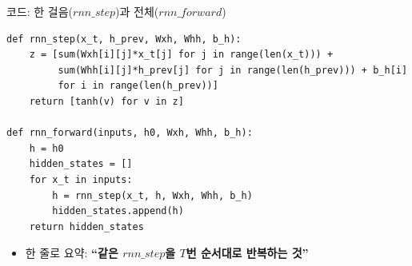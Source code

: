 \begin{frame}[fragile]{코드: 한 걸음($rnn\_step$)과 전체($rnn\_forward$)}
\begin{lstlisting}
def rnn_step(x_t, h_prev, Wxh, Whh, b_h):
    z = [sum(Wxh[i][j]*x_t[j] for j in range(len(x_t))) +
         sum(Whh[i][j]*h_prev[j] for j in range(len(h_prev))) + b_h[i]
         for i in range(len(h_prev))]
    return [tanh(v) for v in z]

def rnn_forward(inputs, h0, Wxh, Whh, b_h):
    h = h0
    hidden_states = []
    for x_t in inputs:
        h = rnn_step(x_t, h, Wxh, Whh, b_h)
        hidden_states.append(h)
    return hidden_states
\end{lstlisting}
  \begin{itemize}
    \item 한 줄로 요약: \textbf{``같은 $rnn\_step$을 $T$번 순서대로
      반복하는 것''}
    
  \end{itemize}

\end{frame}
